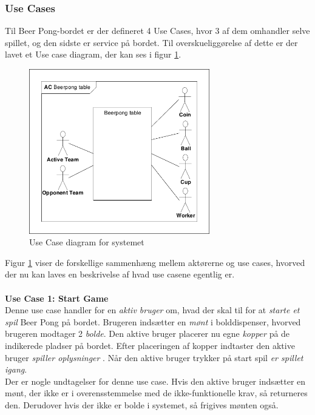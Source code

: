 \documentclass[Rapport/Rapport_main.tex]{subfiles}
\begin{document}
\subsubsection{Use Cases}
Til Beer Pong-bordet er der defineret 4 Use Cases, hvor 3 af dem omhandler selve spillet, og den sidste er service på bordet. Til overskueliggørelse af dette er der lavet et Use case diagram, der kan ses i figur \ref{fig:rap_uc_diagram}.
\begin{figure}[H]
    \centering
    \includegraphics[width=0.7\textwidth,trim={0.24in 0.24in 0.24in 0.24in},clip, page=2]{Kravspecifikation/Funktionelle_krav/graphics_funktionel/Krav-spec-diagrammer.pdf}
    \caption{Use Case diagram for systemet}
    \label{fig:rap_uc_diagram}
\end{figure}
Figur \ref{fig:rap_uc_diagram} viser de forskellige sammenhæng mellem aktørerne og use cases, hvorved der nu kan laves en beskrivelse af hvad use casene egentlig er.\\\\
\textbf{Use Case 1: Start Game}\\
Denne use case handler for en \textit{aktiv bruger} om, hvad der skal til for at \textit{starte et spil} Beer Pong på bordet. Brugeren indsætter en \textit{mønt} i bolddispenser, hvorved brugeren modtager 2 \textit{bolde}. Den aktive bruger placerer nu egne \textit{kopper} på de indikerede pladser på bordet. Efter placeringen af kopper indtaster den aktive bruger \textit{spiller oplysninger} . Når den aktive bruger trykker på start spil \textit{er spillet igang}.\\
Der er nogle undtagelser for denne use case. Hvis den aktive bruger indsætter en mønt, der ikke er i overensstemmelse med de ikke-funktionelle krav, så returneres den. Derudover hvis der ikke er bolde i systemet, så frigives mønten også.\\\\
\end{document}
